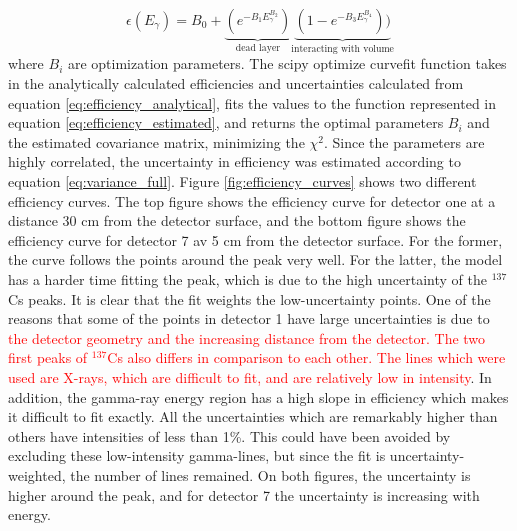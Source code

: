 \begin{equation} \label{eq:efficiency_estimated}
\epsilon(E_\gamma) =  B_0 + \underbrace{(e^{-B_1 E_\gamma^{B_2}})}_\text{dead layer}  \underbrace{(1-e^{-B_3 E_\gamma^{B_4}}))}_\text{interacting with volume} 
\end{equation}
\noindent 
where $B_i$ are optimization parameters. The scipy optimize curvefit function \cite{Virtanen2020} takes in the analytically calculated efficiencies and uncertainties calculated from equation \ref{eq:efficiency_analytical}, fits the values to the function represented in equation \ref{eq:efficiency_estimated}, and returns the optimal parameters $B_i$ and the estimated covariance matrix, minimizing the $\chi^2$. Since the parameters are highly correlated, the uncertainty in efficiency was estimated according to equation \ref{eq:variance_full}. %
Figure \ref{fig:efficiency_curves} shows two different efficiency curves. The top figure shows the efficiency curve for detector one at a distance 30 cm from the detector surface, and the bottom figure shows the efficiency curve for detector 7 av 5 cm from the detector surface. For the former, the curve follows the points around the peak very well. For the latter, the model has a harder time fitting the peak, which is due to the high uncertainty of the $^{137}$Cs peaks. It is clear that the fit weights the low-uncertainty points. One of the reasons that some of the points in detector 1 have large uncertainties is due to \textcolor{red}{the detector geometry and the increasing distance from the detector. The two first peaks of $^{137}$Cs also differs in comparison to each other. The lines which were used are X-rays, which are difficult to fit, and are relatively low in intensity}. In addition, the gamma-ray energy region has a high slope in efficiency which makes it difficult to fit exactly.  All the uncertainties which are remarkably higher than others have intensities of less than 1\%. This could have been avoided by excluding these low-intensity gamma-lines, but since the fit is uncertainty-weighted, the number of lines remained. On both figures, the uncertainty is higher around the peak, and for detector 7 the uncertainty is increasing with energy.   \\

